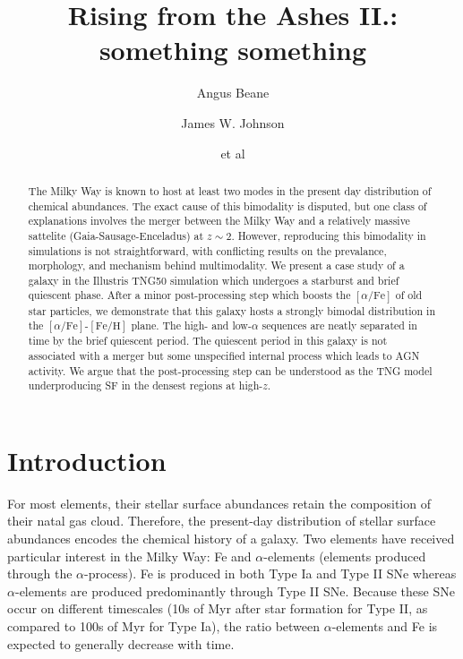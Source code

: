 \documentclass[linenumbers, twocolumn]{aastex631}
\newcommand{\FeH}{\ensuremath{[\textrm{Fe}/\textrm{H}]}}
\newcommand{\alphaFe}{\ensuremath{[\alpha/\textrm{Fe}]}}
\begin{document}
\title{Rising from the Ashes II.: something something}

\author{Angus Beane}

\author{James W. Johnson}

\author{et al}

\begin{abstract}
    The Milky Way is known to host at least two modes in the present day distribution of chemical abundances. The exact cause of this bimodality is disputed, but one class of explanations involves the merger between the Milky Way and a relatively massive sattelite (Gaia-Sausage-Enceladus) at $z\sim2$. However, reproducing this bimodality in simulations is not straightforward, with conflicting results on the prevalance, morphology, and mechanism behind multimodality. We present a case study of a galaxy in the Illustris TNG50 simulation which undergoes a starburst and brief quiescent phase. After a minor post-processing step which boosts the \alphaFe{} of old star particles, we demonstrate that this galaxy hosts a strongly bimodal distribution in the \alphaFe{}-\FeH{} plane. The high- and low-$\alpha$ sequences are neatly separated in time by the brief quiescent period. The quiescent period in this galaxy is not associated with a merger but some unspecified internal process which leads to AGN activity. We argue that the post-processing step can be understood as the TNG model underproducing SF in the densest regions at high-$z$.
  \end{abstract}
    
  

\section{Introduction}\label{sec:intro}
For most elements, their stellar surface abundances retain the composition of their natal gas cloud. Therefore, the present-day distribution of stellar surface abundances encodes the chemical history of a galaxy. Two elements have received particular interest in the Milky Way: Fe and $\alpha$-elements (elements produced through the $\alpha$-process). Fe is produced in both Type Ia and Type II SNe whereas $\alpha$-elements are produced predominantly through Type II SNe. Because these SNe occur on different timescales (10s of Myr after star formation for Type II, as compared to 100s of Myr for Type Ia), the ratio between $\alpha$-elements and Fe is expected to generally decrease with time.
\end{document}
